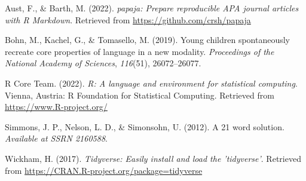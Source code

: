 \documentclass[
  man]{apa6}
\newlength{\cslhangindent}
\newenvironment{CSLReferences}[2] %
 {\begin{list}{}{%
  \setlength{\itemindent}{0pt}
  \setlength{\leftmargin}{0pt}
  \setlength{\parsep}{0pt}
  \ifodd #1
   \setlength{\leftmargin}{\cslhangindent}
   \setlength{\itemindent}{-1\cslhangindent}
  \fi
  \setlength{\itemsep}{#2\baselineskip}}}
 {\end{list}}
\begin{document}
\label{refs}
\begin{CSLReferences}{1}{0}
Aust, F., \& Barth, M. (2022). \emph{{papaja}: {Prepare} reproducible {APA} journal articles with {R Markdown}}. Retrieved from \url{https://github.com/crsh/papaja}

Bohn, M., Kachel, G., \& Tomasello, M. (2019). Young children spontaneously recreate core properties of language in a new modality. \emph{Proceedings of the National Academy of Sciences}, \emph{116}(51), 26072--26077.

R Core Team. (2022). \emph{R: A language and environment for statistical computing}. Vienna, Austria: R Foundation for Statistical Computing. Retrieved from \url{https://www.R-project.org/}

Simmons, J. P., Nelson, L. D., \& Simonsohn, U. (2012). A 21 word solution. \emph{Available at SSRN 2160588}.

Wickham, H. (2017). \emph{Tidyverse: Easily install and load the 'tidyverse'}. Retrieved from \url{https://CRAN.R-project.org/package=tidyverse}

\end{CSLReferences}

\endgroup
\end{document}
